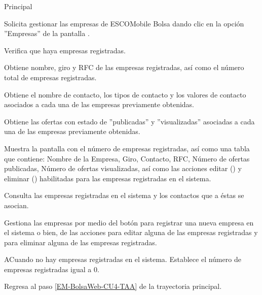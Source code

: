 \begin{UCtrayectoria}{Principal}

	\UCpaso [\UCactor] Solicita gestionar las empresas de ESCOMobile Bolsa dando clic en la opción ''Empresas'' de la pantalla .

	\UCpaso Verifica que haya empresas registradas.  

	\UCpaso Obtiene nombre, giro y RFC de las empresas registradas, así como el número total de empresas registradas.

	\UCpaso Obtiene el nombre de contacto, los tipos de contacto y los valores de contacto asociados a cada una de las empresas previamente obtenidas.

	\UCpaso Obtiene las ofertas con estado de ''publicadas'' y ''visualizadas'' asociadas a cada una de las empresas previamente obtenidas.

	\UCpaso Muestra la pantalla  con el número de empresas registradas, así como una tabla que contiene: Nombre de la Empresa, Giro, Contacto, RFC, Número de ofertas publicadas, Número de ofertas visualizadas, así como las acciones editar () y eliminar () habilitadas para las empresas registradas en el sistema. \label{EM-BolsaWeb-CU4-TAA}

	\UCpaso [\UCactor] Consulta las empresas registradas en el sistema y los contactos que a éstas se asocian. 

	\UCpaso [\UCactor] Gestiona las empresas por medio del botón  para registrar una nueva empresa en el sistema o bien, de las acciones  para editar alguna de las empresas registradas y  para eliminar alguna de las empresas registradas.

\end{UCtrayectoria}

\begin{UCtrayectoriaA}{A}{Cuando no hay empresas registradas en el sistema.}
	\UCpaso Establece el número de empresas registradas igual a 0. 

	\UCpaso Regresa al paso \ref{EM-BolsaWeb-CU4-TAA} de la trayectoria principal.
\end{UCtrayectoriaA}



